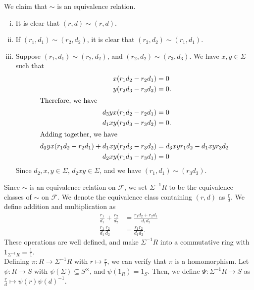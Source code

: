 \documentclass[10pt]{extarticle}
\begin{document}
  We claim that $\sim$ is an equivalence relation.
  \begin{enumerate}[(i)]
    \item It is clear that $(r,d)\sim (r,d)$.
    \item If $(r_1,d_1)\sim (r_2,d_2)$, it is clear that $(r_2,d_2)\sim (r_1,d_1)$.
    \item Suppose $(r_1,d_1) \sim (r_2,d_2)$, and $(r_2,d_2)\sim (r_3,d_3)$. We have $x,y\in \Sigma$ such that 
      \begin{align*}
        x(r_1d_2-r_2d_1) &= 0\\
        y(r_2d_3 - r_3d_2) &= 0.\\
        \intertext{Therefore, we have}
        d_3yx(r_1d_2 - r_2d_1) &= 0\\
        d_1xy(r_2d_3 - r_3d_2) &= 0.\\
        \intertext{Adding together, we have}
        d_3yx(r_1d_2 - r_2d_1) + d_1xy(r_2d_3-r_3d_2) &= d_3xyr_1d_2-d_1xyr_3d_2\\
        d_2xy(r_1d_3-r_3d_1) &= 0
      \end{align*}
      Since $d_2,x,y\in \Sigma$, $d_2xy\in\Sigma$, and we have $(r_1,d_1)\sim (r_3d_3)$.
  \end{enumerate}
  Since $\sim$ is an equivalence relation on $\mathcal{F}$, we set $\Sigma^{-1}R$ to be the equivalence classes of $\sim$ on $\mathcal{F}$. We denote the equivalence class containing $(r,d)$ as $\frac{r}{d}$. We define addition and multiplication as
  \begin{align*}
    \frac{r_1}{d_1} + \frac{r_2}{d_2} &= \frac{r_1d_2 + r_2d_1}{d_1d_2}\\
    \frac{r_1}{d_1}\frac{r_2}{d_2} &= \frac{r_1r_2}{d_1d_2}.
  \end{align*}
  These operations are well defined, and make $\Sigma^{-1}R$ into a commutative ring with $1_{\Sigma^{-1}R} = \frac{1}{1}$.\\

  Defining $\pi: R\rightarrow \Sigma^{-1}R$ with $r\mapsto \frac{r}{1}$, we can verify that $\pi$ is a homomorphism. Let $\psi: R\rightarrow S$ with $\psi(\Sigma)\subseteq S^{\times}$, and $\psi(1_R) = 1_S$. Then, we define $\Psi: \Sigma^{-1}R\rightarrow S$ as $\frac{r}{d}\mapsto \psi(r)\psi(d)^{-1}$.\\
  
\end{document}
